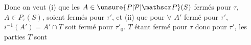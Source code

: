 Donc on veut (i) que les $A\in\unsure{P|\mathcal P|\mathscr P}(S)$ fermés pour $\tau$,  $A\in P_\tau(S)$, soient fermés pour $\tau'$,  et (ii) que pour \uline{$\forall$} $A'$ fermé pour $\tau'$, $i^{-1}(A')=A'\cap T$ soit fermé pour $\tau'_0$.  $T$ étant fermé  pour $\tau$ donc pour $\tau'$, les parties   $T$  sont 
